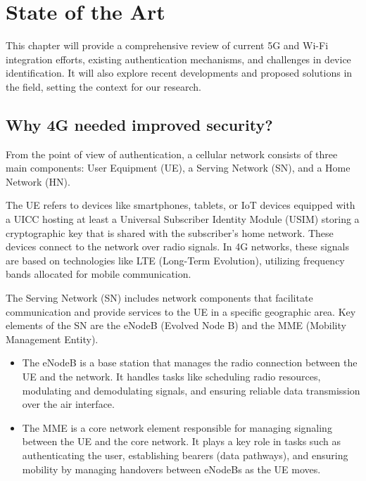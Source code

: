 \chapter{State of the Art}%
\label{chapter:State of the Art}

\begin{introduction}
This chapter will provide a comprehensive review of current \ac{5G} and Wi-Fi integration efforts, existing authentication mechanisms, and challenges in device identification. It will also explore recent developments and proposed solutions in the field, setting the context for our research.
\end{introduction}

\section{Why \acs{4G} needed improved security?}

From the point of view of authentication, a cellular network consists of three main components: User Equipment (UE), a Serving Network (SN), and a Home Network (HN).

The UE refers to devices like smartphones, tablets, or IoT devices equipped with a UICC  hosting at least a Universal Subscriber Identity Module (USIM) storing a cryptographic key that is shared with the subscriber’s home network. These devices connect to the network over radio signals. In 4G networks, these signals are based on technologies like LTE (Long-Term Evolution), utilizing frequency bands allocated for mobile communication.

The Serving Network (SN) includes network components that facilitate communication and provide services to the UE in a specific geographic area. Key elements of the SN are the eNodeB (Evolved Node B) and the MME (Mobility Management Entity).

\begin{itemize}
    \item{
        The eNodeB is a base station that manages the radio connection between the UE and the network. It handles tasks like scheduling radio resources, modulating and demodulating signals, and ensuring reliable data transmission over the air interface.
    }
    \item {
        The MME is a core network element responsible for managing signaling between the UE and the core network. It plays a key role in tasks such as authenticating the user, establishing bearers (data pathways), and ensuring mobility by managing handovers between eNodeBs as the UE moves.
    }
\end{itemize}

